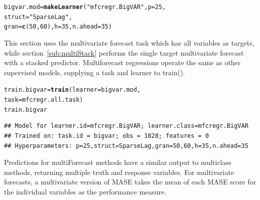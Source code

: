 \documentclass[12pt]{article}\usepackage[]{graphicx}\usepackage[]{color}
\makeatletter
\newcommand{\hlnum}[1]{\textcolor[rgb]{0.686,0.059,0.569}{#1}}%
\newcommand{\hlstr}[1]{\textcolor[rgb]{0.192,0.494,0.8}{#1}}%
\newcommand{\hlstd}[1]{\textcolor[rgb]{0.345,0.345,0.345}{#1}}%
\newcommand{\hlkwb}[1]{\textcolor[rgb]{0.69,0.353,0.396}{#1}}%
\newcommand{\hlkwc}[1]{\textcolor[rgb]{0.333,0.667,0.333}{#1}}%
\newcommand{\hlkwd}[1]{\textcolor[rgb]{0.737,0.353,0.396}{\textbf{#1}}}%
\newenvironment{kframe}{%
 \def\at@end@of@kframe{}%
 \ifinner\ifhmode%
  \def\at@end@of@kframe{\end{minipage}}%
  \begin{minipage}{\columnwidth}%
 \fi\fi%
 \def\FrameCommand##1{\hskip\@totalleftmargin \hskip-\fboxsep
 \colorbox{shadecolor}{##1}\hskip-\fboxsep
     \hskip-\linewidth \hskip-\@totalleftmargin \hskip\columnwidth}%
 \MakeFramed {\advance\hsize-\width
   \@totalleftmargin\z@ \linewidth\hsize
   \@setminipage}}%
 {\par\unskip\endMakeFramed%
 \at@end@of@kframe}
\newenvironment{knitrout}{}{} %
\theoremstyle{definition}
\newcommand\code{\@codex}
\def\@codex#1{{\normalfont\ttfamily\hyphenchar\font=-1 #1}}
\makeatother
\begin{document}
\singlespacing
\begin{knitrout}
\color{fgcolor}\begin{kframe}
\begin{alltt}
\hlstd{bigvar.mod} \hlkwb{=} \hlkwd{makeLearner}\hlstd{(}\hlstr{"mfcregr.BigVAR"}\hlstd{,}\hlkwc{p} \hlstd{=} \hlnum{25}\hlstd{,}
                         \hlkwc{struct} \hlstd{=} \hlstr{"SparseLag"}\hlstd{,}
                         \hlkwc{gran} \hlstd{=} \hlkwd{c}\hlstd{(}\hlnum{50}\hlstd{,} \hlnum{60}\hlstd{),}\hlkwc{h} \hlstd{=} \hlnum{35}\hlstd{,} \hlkwc{n.ahead} \hlstd{=} \hlnum{35}\hlstd{)}
\end{alltt}
\end{kframe}
\end{knitrout}

This section uses the multivariate forecast task which has all variables as targets, while section~\ref{sub:multiStack} performs the single target multivariate forecast with a stacked predictor. Multiforecast regressions operate the same as other supervised models, supplying a task and learner to \code{train()}.

\begin{knitrout}
\color{fgcolor}\begin{kframe}
\begin{alltt}
\hlstd{train.bigvar} \hlkwb{=} \hlkwd{train}\hlstd{(}\hlkwc{learner} \hlstd{= bigvar.mod,}
                     \hlkwc{task} \hlstd{= mfcregr.all.task )}
\hlstd{train.bigvar}
\end{alltt}
\end{kframe}
\end{knitrout}

\begin{knitrout}
\color{fgcolor}\begin{kframe}
\begin{verbatim}
## Model for learner.id=mfcregr.BigVAR; learner.class=mfcregr.BigVAR
## Trained on: task.id = bigvar; obs = 1828; features = 0
## Hyperparameters: p=25,struct=SparseLag,gran=50,60,h=35,n.ahead=35
\end{verbatim}
\end{kframe}
\end{knitrout}
\doublespacing

Predictions for \code{multiForecast} methods have a similar output to \code{multiclass} methods, returning multiple truth and response variables. For multivariate forecasts, a multivariate version of MASE takes the mean of each MASE score for the individual variables as the performance measure.
\end{document}
